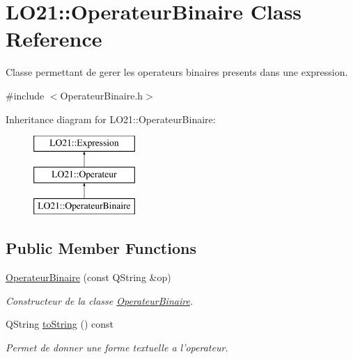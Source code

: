 \hypertarget{class_l_o21_1_1_operateur_binaire}{\section{\-L\-O21\-:\-:\-Operateur\-Binaire \-Class \-Reference}
\label{class_l_o21_1_1_operateur_binaire}
}


\-Classe permettant de gerer les operateurs binaires presents dans une expression.  




{\ttfamily \#include $<$\-Operateur\-Binaire.\-h$>$}

\-Inheritance diagram for \-L\-O21\-:\-:\-Operateur\-Binaire\-:\begin{figure}[H]
\begin{center}
\leavevmode
\includegraphics[height=3.000000cm]{class_l_o21_1_1_operateur_binaire}
\end{center}
\end{figure}
\subsection*{\-Public \-Member \-Functions}
\begin{DoxyCompactItemize}
\item 
\hyperlink{class_l_o21_1_1_operateur_binaire_a09e3546e9c5f993e549aedd6b26b3ca5}{\-Operateur\-Binaire} (const \-Q\-String \&op)
\begin{DoxyCompactList}\small\item\em \-Constructeur de la classe \hyperlink{class_l_o21_1_1_operateur_binaire}{\-Operateur\-Binaire}. \end{DoxyCompactList}\item 
\-Q\-String \hyperlink{class_l_o21_1_1_operateur_binaire_a7a25e004beb162f80873002759b4310e}{to\-String} () const 
\begin{DoxyCompactList}\small\item\em \-Permet de donner une forme textuelle a l'operateur. \end{DoxyCompactList}\end{DoxyCompactItemize}


